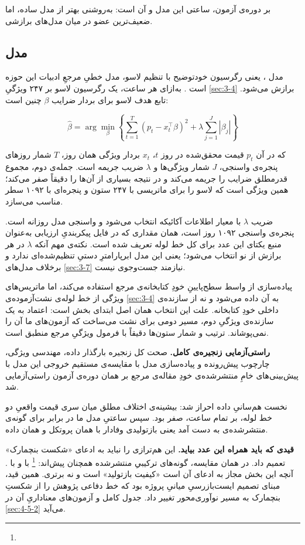 بر دوره‌ی آزمون،  ساعتی این مدل  و  آن  است:
به‌روشنی بهتر از مدل ساده، اما ضعیف‌ترین عضو در میان مدل‌های برازشی.

\subsection*{مدل }

مدل ، یعنی رگرسیون خودتوضیح با تنظیم لاسو، مدل خطیِ مرجعِ ادبیات این حوزه
است \cite{lago_forecasting_2021, lago_forecasting_2018}. به‌ازای هر ساعت، یک رگرسیون
لاسو بر ۲۴۷ ویژگیِ \cref{sec:3-4} برازش می‌شود. تابع هدف لاسو برای بردار ضرایب $\beta$
چنین است:

\begin{equation}
\hat{\beta} = \arg\min_{\beta}
\left\{ \sum_{t=1}^{T}\left(p_t - x_t^{\top}\beta\right)^2
+ \lambda \sum_{j=1}^{J} \left|\beta_j\right| \right\}
\end{equation}

که در آن $p_t$ قیمت محقق‌شده در روز $t$، $x_t$ بردار ویژگی همان روز، $T$ شمار روزهای
پنجره‌ی واسنجی، $J$ شمار ویژگی‌ها و $\lambda$ ضریب جریمه است. جمله‌ی دوم، مجموع قدرمطلق
ضرایب را جریمه می‌کند و در نتیجه بسیاری از آن‌ها را دقیقاً صفر می‌کند؛ همین ویژگی
است که لاسو را برای ماتریسی با ۲۴۷ ستون و پنجره‌ای با ۱۰۹۲ سطر مناسب می‌سازد.

ضریب $\lambda$ با معیار اطلاعات آکائیکه انتخاب می‌شود و واسنجی مدل روزانه است.
پنجره‌ی واسنجی ۱۰۹۲ روز است، همان مقداری که در فایل پیکربندیِ ارزیابی به‌عنوان منبع
یکتای این عدد برای کل خط لوله تعریف شده است. نکته‌ی مهم آنکه $\lambda$ در هر برازش از
نو انتخاب می‌شود؛ یعنی این مدل ابرپارامترِ دستیِ تنظیم‌شده‌ای ندارد و برخلاف مدل‌های
\cref{sec:3-7} نیازمند جست‌وجوی  نیست.

پیاده‌سازی از واسط سطح‌پایینِ خودِ کتابخانه‌ی مرجع استفاده می‌کند، اما ماتریس‌های
ویژگی از خط لوله‌ی نشت‌آزموده‌ی \cref{sec:3-4} به آن داده می‌شود و نه از سازنده‌ی داخلی خودِ
کتابخانه. علت این انتخاب همان اصل ابتدای بخش است: اعتماد به یک سازنده‌ی ویژگیِ دوم،
مسیر دومی برای نشت می‌ساخت که آزمون‌های ما آن را نمی‌پوشاند. ترتیب و شمار ستون‌ها
دقیقاً با فرمول ویژگیِ مرجع منطبق است.

\textbf{راستی‌آزمایی زنجیره‌ی کامل.} صحت کل زنجیره  بارگذار داده، مهندسی ویژگی،
چارچوب پیش‌رونده و پیاده‌سازی مدل  با مقایسه‌ی مستقیم خروجی این مدل با
پیش‌بینی‌های خامِ منتشرشده‌ی خودِ مقاله‌ی مرجع بر همان دوره‌ی آزمون راستی‌آزمایی شد.

نخست هم‌سانیِ داده احراز شد: بیشینه‌ی اختلاف مطلق میان سری قیمت واقعیِ دو خط لوله، بر
تمام  ساعت، صفر بود. سپس  ساعتیِ مدل ما  در برابر
 برای گونه‌ی منتشرشده‌ی  به دست آمد  یعنی بازتولیدی وفادار
با همان پروتکل و همان داده.

\textbf{قیدی که باید همراه این عدد بیاید.} این هم‌ترازی را نباید به ادعای «شکست
بنچمارک» تعمیم داد. در همان مقایسه، گونه‌های ترکیبیِ منتشرشده همچنان پیش‌اند:
\footnote{} با  و
 با . آنچه این بخش
مجاز به ادعای آن است «کیفیت بازتولید» است و نه برتری. همین قید، مبنای تصمیم
ایست‌بازرسیِ میانیِ پروژه بود که خط دفاعی پژوهش را از شکستِ بنچمارک به مسیر
نوآوری‌محور تغییر داد. جدول کامل و آزمون‌های معناداریِ آن در \cref{sec:4-5-2} می‌آید.
